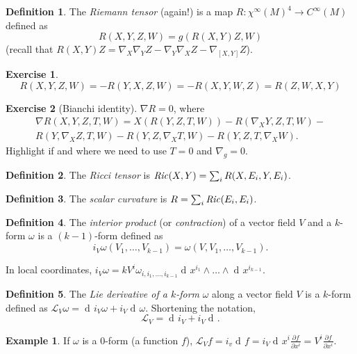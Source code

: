 \documentclass[a4paper,12pt]{book}
\newcommand{\dd}{\mathop{\mathrm{d}\!}{}}
\theoremstyle{definition}
\newtheorem{definition}{Definition}
\newtheorem{example}{Example}
\newtheorem{exercise}{Exercise}
\theoremstyle{remark}
\begin{document}
\begin{definition}
The \emph{Riemann tensor} (again!) is a map $R\colon\chi^\infty(M)^4\to C^\infty(M)$ defined as
\[R(X,Y,Z,W)=g(R(X,Y)Z,W)\]
(recall that $R(X,Y)Z=\nabla_X\nabla_YZ-\nabla_Y\nabla_XZ-\nabla_{[X,Y]}Z$).
\end{definition}

\begin{exercise}
\[R(X,Y,Z,W)=-R(Y,X,Z,W)=-R(X,Y,W,Z)=R(Z,W,X,Y)\]
\label{riemannsymmetries}
\end{exercise}

\begin{exercise}[Bianchi identity]
$\nabla R=0$, where
\begin{multline*}
\nabla R(X,Y,Z,T,W)=X(R(Y,Z,T,W))-R(\nabla_XY,Z,T,W)-\\
R(Y,\nabla_XZ,T,W)-R(Y,Z,\nabla_XT,W)-R(Y,Z,T,\nabla_XW).\end{multline*}
Highlight if and where we need to use $T=0$ and $\nabla_g=0$.
\end{exercise}

\begin{definition}
The \emph{Ricci tensor} is $\text{\emph{Ric}}(X,Y)=\sum_i R(X,E_i,Y,E_i)$.
\end{definition}

\begin{definition}
The \emph{scalar curvature} is $R=\sum_i \text{\emph{Ric}}(E_i,E_i)$.
\end{definition}

\begin{definition}
The \emph{interior product} (or \emph{contraction}) of a vector field $V$ and a $k$-form $\omega$ is a $(k-1)$-form defined as
\[i_V\omega(V_1,\ldots,V_{k-1})=\omega(V,V_1,\ldots,V_{k-1}).\]
\end{definition}

In local coordinates, $i_V\omega=kV^i\omega_{i,i_1,\ldots,i_{k-1}}\dd x^{i_1}\wedge\ldots\wedge\dd x^{i_{k-1}}$.

\begin{definition}
The \emph{Lie derivative of a $k$-form} $\omega$ along a vector field $V$ is a $k$-form defined as $\mathcal L_V\omega=\dd i_V\omega+i_V\dd\omega$. Shortening the notation,
\[\mathcal L_V=\dd i_V+i_V\dd.\]
\end{definition}

\begin{example}
If $\omega$ is a 0-form (a function $f$), $\mathcal L_Vf=i_v\dd f=i_V\dd x^i\frac{\partial f}{\partial x^i}=V^i\frac{\partial f}{\partial x^i}.$
\end{example}
\end{document}
